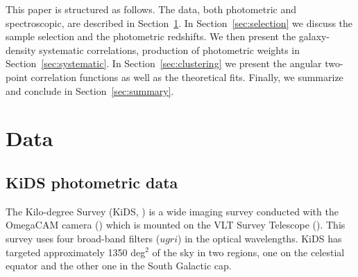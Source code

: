 \documentclass[fleqn,usenatbib,useAMS]{mnras}
\begin{document}

This paper is structured as follows. The data, both photometric and spectroscopic, are described in Section~\ref{sec:data}. In Section~\ref{sec:selection} we discuss the sample selection and the photometric redshifts. We then present the galaxy-density systematic correlations, production of photometric weights in Section~\ref{sec:systematic}. In Section~\ref{sec:clustering} we present the angular two-point correlation functions as well as the theoretical fits. Finally, we summarize and conclude in Section~\ref{sec:summary}. 

\section{Data}\label{sec:data}

\subsection{KiDS photometric data}\label{sec:kids}

The Kilo-degree Survey (KiDS, \citealt{kids}) is a wide 
imaging survey conducted with the OmegaCAM camera (\citealt{omegacam}) which is mounted on the VLT Survey Telescope (\citealt{vst}). This survey uses four broad-band filters ($ugri$) in the optical wavelengths. KiDS has targeted approximately 1350 deg$^2$ of the sky in two regions, one on the celestial equator and the other one in the South Galactic cap. 
\end{document}
